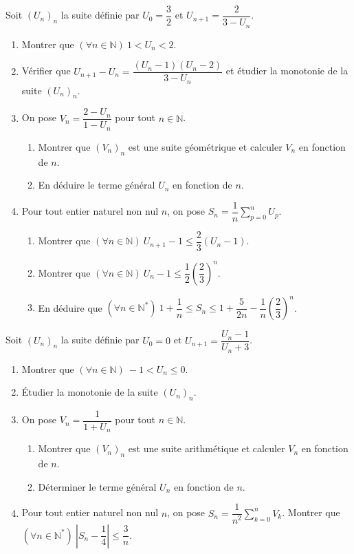 Soit $(U_n)_n$ la suite définie par $U_0=\dfrac32$ et $U_{n+1}=\dfrac{2}{3-U_n}$.
\begin{enumerate}
\item Montrer que $(\forall n\in\mathbb{N})\ 1<U_n<2$.
\item Vérifier que $U_{n+1}-U_n=\dfrac{(U_n-1)(U_n-2)}{3-U_n}$ et étudier la monotonie de la suite $(U_n)_n$.
\item On pose $V_n=\dfrac{2-U_n}{1-U_n}$ pour tout $n\in\mathbb{N}$.
\begin{enumerate}
\item Montrer que $(V_n)_n$ est une suite géométrique et calculer $V_n$ en fonction de $n$.
\item En déduire le terme général $U_n$ en fonction de $n$.
\end{enumerate}
\item Pour tout entier naturel non nul $n$, on pose $S_n=\dfrac1n\displaystyle\sum_{p=0}^{n}U_p$.
\begin{enumerate}
\item Montrer que $(\forall n\in\mathbb{N})\ U_{n+1}-1\leq\dfrac23(U_n-1)$.
\item Montrer que $(\forall n\in\mathbb{N})\ U_n-1\leq\dfrac12\left(\dfrac23\right)^n$.
\item En déduire que $(\forall n\in\mathbb{N}^*)\ 1+\dfrac1n\leq S_n\leq1+\dfrac{5}{2n}-\dfrac1n\left(\dfrac23\right)^n$.
\end{enumerate}
\end{enumerate}
\fin
{}
Soit $(U_n)_n$ la suite définie par $U_0=0$ et $U_{n+1}=\dfrac{U_n-1}{U_n+3}$.
\begin{enumerate}
\item Montrer que $(\forall n\in\mathbb{N})\ -1<U_n\leq0$.
\item Étudier la monotonie de la suite $(U_n)_n$.
\item On pose $V_n=\dfrac{1}{1+U_n}$ pour tout $n\in\mathbb{N}$.
\begin{enumerate}
\item Montrer que $(V_n)_n$ est une suite arithmétique et calculer $V_n$ en fonction de $n$.
\item Déterminer le terme général $U_n$ en fonction de $n$.
\end{enumerate}
\item Pour tout entier naturel non nul $n$, on pose $S_n=\dfrac{1}{n^2}\displaystyle\sum_{k=0}^{n}V_k$. Montrer que $(\forall n\in\mathbb{N}^*)\ \left|S_n-\dfrac14\right|\leq\dfrac3n$.
\end{enumerate}
